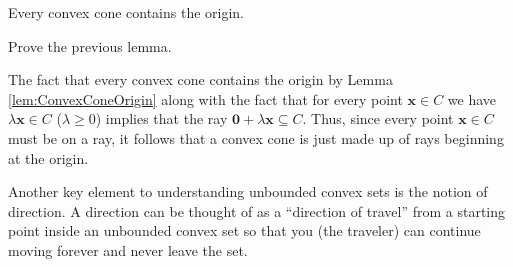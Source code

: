 \begin{lemma} Every convex cone contains the origin.
\label{lem:ConvexConeOrigin}
\end{lemma}

\begin{exercise} Prove the previous lemma. 
\end{exercise}

The fact that every convex cone contains the origin by Lemma \ref{lem:ConvexConeOrigin} along with the fact that for every point $\mathbf{x} \in C$ we have $\lambda\mathbf{x} \in C$ ($\lambda \geq 0$) implies that the ray $\mathbf{0} + \lambda\mathbf{x} \subseteq C$. Thus, since every point $\mathbf{x} \in C$ must be on a ray, it follows that a convex cone is just made up of rays beginning at the origin. 

Another key element to understanding unbounded convex sets is the notion of direction. A direction can be thought of as  a ``direction of travel'' from a starting point inside an unbounded convex set so that you (the traveler) can continue moving forever and never leave the set.

